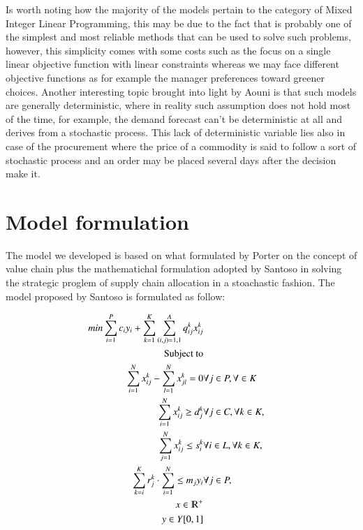 \documentclass{article}
\begin{document}
  Is worth noting how the majority of the models pertain to the category of Mixed Integer Linear Programming, this may be due to the fact that is probably one of the simplest and most reliable methods that can be used to solve such problems, however, this simplicity comes with some costs such as the focus on a single linear objective function with linear constraints whereas we may face different objective functions as for example the manager preferences toward greener choices. Another interesting topic brought into light by Aouni \cite{azimian_supply_2017} is that such models are generally deterministic, where in reality such assumption does not hold most of the time, for example, the demand forecast can't be deterministic at all and derives from a stochastic process. This lack of deterministic variable lies also in case of the procurement where the price of a commodity is said to follow a sort of stochastic process and an order may be placed several days after the decision make it.


\section{Model formulation}
The model we developed is based on what formulated by Porter on the concept of value chain \cite{} plus the mathematichal formulation adopted by Santoso in solving the strategic proglem of supply chain allocation in a stoachastic fashion.
The model proposed by Santoso is formulated as follow:

\begin{equation*}
\begin{aligned}
	min \sum_{i=1}^{P} c_i y_i  + \sum_{k=1}^{K} \sum_{(i,j)=1,1}^{A} q_{ij}^{k}x_{ij}^{k}
  \\
  \text{Subject to}
  \\
  \sum_{i=1}^{N} x_{ij}^k - \sum_{l=1}^{N} x_{jl}^k = 0 & \forall j \in P, \forall \in K
  \\
  \sum_{i=1}^{N} x_{ij}^k \geq d_{j}^k & \forall j \in C, \forall k \in K,
  \\
  \sum_{j=1}^{N} x_{ij}^{k} \leq s_{i}^{k}  & \forall i \in L, \forall k \in K,
  \\
  \sum_{k=i}^{K} r_{j}^k \cdot \sum_{i=1}^{N} \leq m_j y_i & \forall j \in P,
  \\
  x \in \varmathbb{R}^+
  \\
  y \in Y[0,1] \\
\end{aligned}
\end{equation*}
\end{document}
